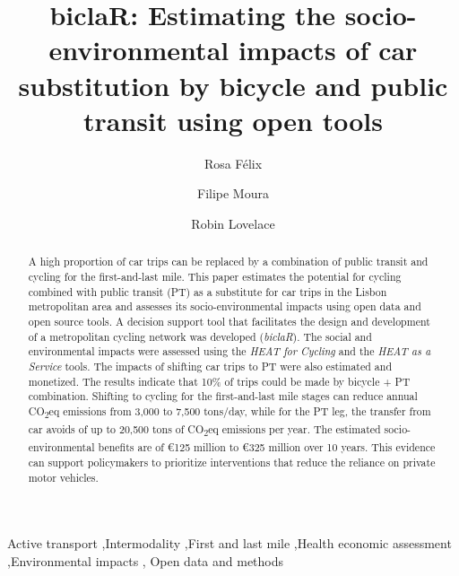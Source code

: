 \documentclass[review, doubleblind, 3p,
authoryear]{elsarticle} %
\begin{document}
\begin{frontmatter}

  \title{biclaR: Estimating the socio-environmental impacts of car
substitution by bicycle and public transit using open tools}
    \author[CERIS]{Rosa Félix%
  }
    \author[CERIS]{Filipe Moura%
  }
    \author[ITS]{Robin Lovelace%
  }
  
  \begin{abstract}
  A high proportion of car trips can be replaced by a combination of
  public transit and cycling for the first-and-last mile. This paper
  estimates the potential for cycling combined with public transit (PT)
  as a substitute for car trips in the Lisbon metropolitan area and
  assesses its socio-environmental impacts using open data and open
  source tools. A decision support tool that facilitates the design and
  development of a metropolitan cycling network was developed
  (\emph{biclaR}). The social and environmental impacts were assessed
  using the \emph{HEAT for Cycling} and the \emph{HEAT as a Service}
  tools. The impacts of shifting car trips to PT were also estimated and
  monetized. The results indicate that 10\% of trips could be made by
  bicycle + PT combination. Shifting to cycling for the first-and-last
  mile stages can reduce annual CO\textsubscript{2}eq emissions from
  3,000 to 7,500 tons/day, while for the PT leg, the transfer from car
  avoids of up to 20,500 tons of CO\textsubscript{2}eq emissions per
  year. The estimated socio-environmental benefits are of €125 million
  to €325 million over 10 years. This evidence can support policymakers
  to prioritize interventions that reduce the reliance on private motor
  vehicles.\\
  \end{abstract}
    \begin{keyword}
    Active transport \sep Intermodality \sep First and last
mile \sep Health economic assessment \sep Environmental impacts \sep 
    Open data and methods
  \end{keyword}
  
 \end{frontmatter}
\end{document}
